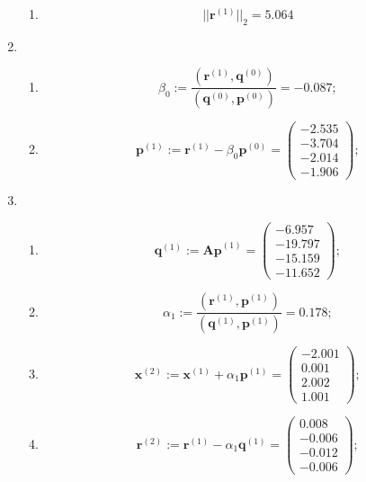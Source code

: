 \begin{enumerate}
\begin{enumerate}
        \item $$||\mathbf{r}^{(1)}||_2 = \mathbf{5.064}$$
    \end{enumerate}

    \item \begin{enumerate}
        \item $$\beta_0 :=
            \dfrac{(\mathbf{r}^{(1)}, \mathbf{q}^{(0)})}{(\mathbf{q}^{(0)}, \mathbf{p}^{(0)})} = -0.087;$$

        \item $$\mathbf{p}^{(1)} :=
            \mathbf{r}^{(1)}-\beta_0\mathbf{p}^{(0)} = \begin{pmatrix} -2.535\\-3.704\\-2.014\\-1.906 \end{pmatrix};$$
    \end{enumerate}

    \item \begin{enumerate}
        \item $$\mathbf{q}^{(1)} :=
            \mathbf{Ap}^{(1)} = \begin{pmatrix} -6.957\\-19.797\\-15.159\\-11.652 \end{pmatrix};$$

        \item $$\alpha_1 :=
            \dfrac{(\mathbf{r}^{(1)}, \mathbf{p}^{(1)})}{(\mathbf{q}^{(1)}, \mathbf{p}^{(1)})} = 0.178;$$

        \item $$\mathbf{x}^{(2)} :=
            \mathbf{x}^{(1)}+\alpha_1\mathbf{p}^{(1)} = \begin{pmatrix} -2.001\\0.001\\2.002\\1.001 \end{pmatrix};$$

        \item $$\mathbf{r}^{(2)} :=
            \mathbf{r}^{(1)}-\alpha_1\mathbf{q}^{(1)} = \begin{pmatrix} 0.008\\-0.006\\-0.012\\-0.006 \end{pmatrix};$$


\end{enumerate}
\end{enumerate}
